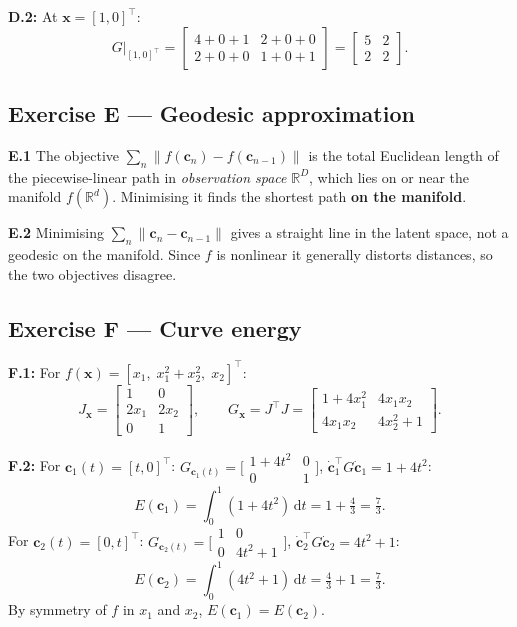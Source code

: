 \documentclass[12pt,a4paper]{article}
\newcommand{\ans}[1]{\tcbox[colback=yellow!20,colframe=orange!60,size=small]{\textbf{#1}}}
\begin{document}
\textbf{D.2:} At $\mathbf{x}=[1,0]^\top$:
\[
  G\big|_{[1,0]^\top}=\begin{bmatrix}4+0+1&2+0+0\\2+0+0&1+0+1\end{bmatrix}=\boxed{\begin{bmatrix}5&2\\2&2\end{bmatrix}.}
\]

\subsection*{Exercise E --- Geodesic approximation}

\textbf{E.1 \hfill \ans{Answer: B}}
The objective $\sum_n\|f(\mathbf{c}_n)-f(\mathbf{c}_{n-1})\|$ is the total Euclidean length of the
piecewise-linear path in \emph{observation space} $\mathbb{R}^D$, which lies on or near the manifold
$f(\mathbb{R}^d)$.  Minimising it finds the shortest path \textbf{on the manifold}.

\textbf{E.2 \hfill \ans{Answer: B}}
Minimising $\sum_n\|\mathbf{c}_n-\mathbf{c}_{n-1}\|$ gives a straight line in the latent space, not
a geodesic on the manifold.  Since $f$ is nonlinear it generally distorts distances, so the two
objectives disagree.

\subsection*{Exercise F --- Curve energy}

\textbf{F.1:} For $f(\mathbf{x})=[x_1,\;x_1^2+x_2^2,\;x_2]^\top$:
\[
  J_\mathbf{x}=\begin{bmatrix}1&0\\2x_1&2x_2\\0&1\end{bmatrix},\qquad
  G_\mathbf{x}=J^\top J=\begin{bmatrix}1+4x_1^2&4x_1x_2\\4x_1x_2&4x_2^2+1\end{bmatrix}.
\]

\textbf{F.2:} For $\mathbf{c}_1(t)=[t,0]^\top$: $G_{\mathbf{c}_1(t)}=\bigl[\begin{smallmatrix}1+4t^2&0\\0&1\end{smallmatrix}\bigr]$,
$\dot{\mathbf{c}}_1^\top G\dot{\mathbf{c}}_1=1+4t^2$:
\[
  E(\mathbf{c}_1)=\int_0^1(1+4t^2)\,\mathrm{d}t=1+\tfrac{4}{3}=\boxed{\tfrac{7}{3}.}
\]
For $\mathbf{c}_2(t)=[0,t]^\top$: $G_{\mathbf{c}_2(t)}=\bigl[\begin{smallmatrix}1&0\\0&4t^2+1\end{smallmatrix}\bigr]$,
$\dot{\mathbf{c}}_2^\top G\dot{\mathbf{c}}_2=4t^2+1$:
\[
  E(\mathbf{c}_2)=\int_0^1(4t^2+1)\,\mathrm{d}t=\tfrac{4}{3}+1=\boxed{\tfrac{7}{3}.}
\]
By symmetry of $f$ in $x_1$ and $x_2$, $E(\mathbf{c}_1)=E(\mathbf{c}_2)$.
\end{document}
